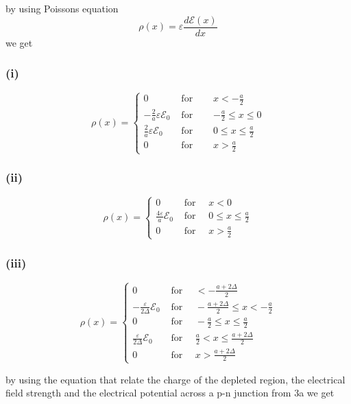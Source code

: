 by using Poissons equation
\[\rho(x)=\varepsilon\frac{d\mathscr{E}(x)}{dx}\]
we get

\subsubsection*{(i)} 

\[\rho(x)=\left\{\begin{array}{lll}0 & \text { for } & x<-\frac{a}{2} \\-\frac{2}{a} \varepsilon \mathscr{E}_{0} & \text { for } & -\frac{a}{2} \leq x \leq 0 \\\frac{2}{a} \varepsilon \mathscr{E}_{0} & \text { for } & 0 \leq x \leq \frac{a}{2} \\0 & \text { for } \quad & x>\frac{a}{2}\end{array}\right.\]
\subsubsection*{(ii) }
\[\rho(x)=\left\{\begin{array}{ll}0 & \text { for } \quad x<0 \\\frac{4 \varepsilon}{a} \mathscr{E}_{0} & \text { for } \quad 0 \leq x \leq \frac{a}{2} \\0 & \text { for } \quad x>\frac{a}{2}\end{array}\right.\]
\subsubsection*{(iii) }
\[\rho(x)=\left\{\begin{array}{ll}0 & \text { for } \quad<-\frac{a+2 \Delta}{2} \\-\frac{\varepsilon}{2 \Delta} \mathscr{E}_{0} & \text { for } \quad-\frac{a+2 \Delta}{2} \leq x<-\frac{a}{2} \\0 & \text { for } \quad-\frac{a}{2} \leq x \leq \frac{a}{2} \\\frac{\varepsilon}{2 \Delta} \mathscr{E}_{0} & \text { for } \quad \frac{a}{2}<x \leq \frac{a+2 \Delta}{2} \\0 & \text { for } \quad x>\frac{a+2 \Delta}{2}\end{array}\right.\]


by using the equation that relate the charge of the depleted region, the electrical
field strength and the electrical potential across a p-n junction from 3a we get



